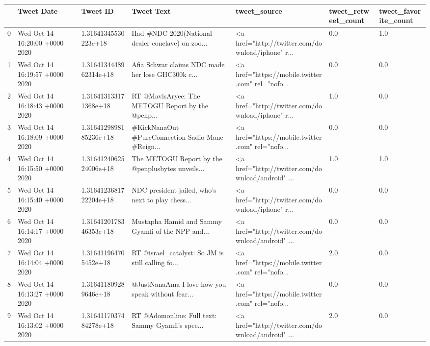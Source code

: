 \begin{tabular}{lllllll}
\toprule
{} &                      Tweet Date &                Tweet ID &                                         Tweet Text &                                       tweet\_source & tweet\_retweet\_count & tweet\_favorite\_count \\
\midrule
0 &  Wed Oct 14 16:20:00 +0000 2020 &    1.31641345530223e+18 &  Had \#NDC 2020(National dealer conclave) on zoo... &  <a href="http://twitter.com/download/iphone" r... &                 0.0 &                  1.0 \\
1 &  Wed Oct 14 16:19:57 +0000 2020 &  1.3164134448962314e+18 &  Afia Schwar claims NDC made her lose GHC300k c... &  <a href="https://mobile.twitter.com" rel="nofo... &                 0.0 &                  0.0 \\
2 &  Wed Oct 14 16:18:43 +0000 2020 &   1.316413133171368e+18 &  RT @MavisAryee: The METOGU Report by the @penp... &  <a href="http://twitter.com/download/iphone" r... &                 1.0 &                  0.0 \\
3 &  Wed Oct 14 16:18:09 +0000 2020 &  1.3164129898185236e+18 &  \#KickNanaOut \#PureConnection Sadio Mane \#Reign... &  <a href="https://mobile.twitter.com" rel="nofo... &                 0.0 &                  0.0 \\
4 &  Wed Oct 14 16:15:50 +0000 2020 &  1.3164124062524006e+18 &  The METOGU Report by the @penplusbytes unveils... &  <a href="http://twitter.com/download/android" ... &                 1.0 &                  1.0 \\
5 &  Wed Oct 14 16:15:40 +0000 2020 &  1.3164123681722204e+18 &  NDC president jailed, who’s next to play chess... &  <a href="http://twitter.com/download/iphone" r... &                 0.0 &                  0.0 \\
6 &  Wed Oct 14 16:14:17 +0000 2020 &  1.3164120178346353e+18 &  Mustapha Hamid and Sammy Gyamfi of the NPP and... &  <a href="http://twitter.com/download/android" ... &                 0.0 &                  0.0 \\
7 &  Wed Oct 14 16:14:04 +0000 2020 &   1.316411964705452e+18 &  RT @israel\_catalyst: So JM is still calling fo... &  <a href="https://mobile.twitter.com" rel="nofo... &                 2.0 &                  0.0 \\
8 &  Wed Oct 14 16:13:27 +0000 2020 &   1.316411809289646e+18 &  @JustNanaAma I love how you speak without fear... &  <a href="https://mobile.twitter.com" rel="nofo... &                 0.0 &                  0.0 \\
9 &  Wed Oct 14 16:13:02 +0000 2020 &  1.3164117037484278e+18 &  RT @Adomonline: Full text: Sammy Gyamfi’s spee... &  <a href="http://twitter.com/download/android" ... &                 2.0 &                  0.0 \\
\bottomrule
\end{tabular}
